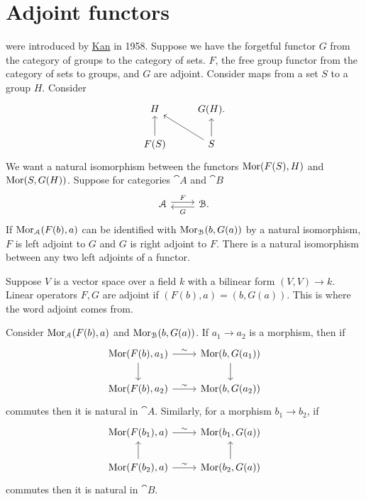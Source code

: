 \documentclass[11pt, oneside]{article}
\begin{document}
\section{Adjoint functors}
\href{https://en.wikipedia.org/wiki/Adjoint_functors}{} were introduced by \href{https://en.wikipedia.org/wiki/Daniel_Kan}{\color{black}Kan} in 1958. Suppose we have the forgetful functor $G$ from the category of groups to the category of sets. $F$, the free group functor from the category of sets to groups, and $G$ are adjoint. Consider maps from a set $S$ to a group $H$. Consider
\[
\begin{tikzcd}
H & G(H). \\
F(S) \arrow[u] & S \arrow[u]\arrow[lu]
\end{tikzcd}
\]
We want a natural isomorphism between the functors $\operatorname{Mor} (F(S), H)$ and $\operatorname{Mor} (S, G(H))$. Suppose for categories $\cat A$ and $\cat B$
\[
\begin{tikzcd}
\cat A \arrow[r, shift left, "F"]& \cat B\arrow[l, shift left, "G"].
\end{tikzcd}
\]
If $\operatorname{Mor}_{\mathcal A}(F(b), a)$ can be identified with $\operatorname{Mor}_{\mathcal B}(b, G(a))$ by a natural isomorphism, $F$ is left adjoint to $G$ and $G$ is right adjoint to $F$. There is a natural isomorphism between any two left adjoints of a functor.

Suppose $V$ is a vector space over a field $k$ with a bilinear form $(V,V)\longrightarrow k$. Linear operators $F, G$ are adjoint if $(F(b), a)=(b, G(a))$. This is where the word adjoint comes from.

Consider $\operatorname{Mor}_{\mathcal A}(F(b), a)$ and $\operatorname{Mor}_{\mathcal B}(b, G(a))$. If $a_1\longrightarrow a_2$ is a morphism, then if
\[
\begin{tikzcd}
\Mor(F(b), a_1) \arrow[r,"\sim"] \arrow[d, ] &\Mor (b, G(a_1)) \arrow[d,]\\ \Mor(F(b), a_2)\arrow[r, "\sim"] & \Mor(b, G(a_2))
\end{tikzcd}
\]
commutes then it is natural in $\cat A$. Similarly, for a morphism $b_1\longrightarrow b_2$, if
\[
\begin{tikzcd}
\Mor(F(b_1), a) \arrow[r, "\sim"] &\Mor (b_1, G(a)) \\ \Mor(F(b_2), a)\arrow[r, "\sim"] \arrow[u]& \Mor(b_2, G(a)) \arrow[u]
\end{tikzcd}
\]
commutes then it is natural in $\cat B$.
\end{document}
